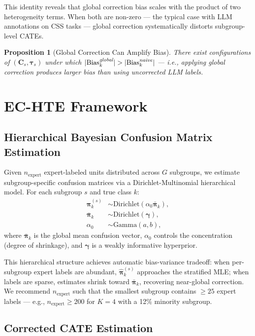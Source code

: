 \documentclass[11pt,a4paper]{article}
\newtheorem{proposition}{Proposition}
\begin{document}
This identity reveals that global correction bias scales with the product of two heterogeneity terms.
When both are non-zero --- the typical case with LLM annotations on CSS tasks --- global correction systematically distorts subgroup-level CATEs.

\begin{proposition}[Global Correction Can Amplify Bias]\label{prop:hurt}
There exist configurations of $(\mathbf{C}_s, \boldsymbol{\tau}_s)$ under which $|\text{Bias}^{\emph{global}}_k| > |\text{Bias}^{\emph{naive}}_k|$ --- i.e., applying global correction produces larger bias than using uncorrected LLM labels.
\end{proposition}

\section{EC-HTE Framework}

\subsection{Hierarchical Bayesian Confusion Matrix Estimation}

Given $n_{\text{expert}}$ expert-labeled units distributed across $G$ subgroups, we estimate subgroup-specific confusion matrices via a Dirichlet-Multinomial hierarchical model.
For each subgroup $s$ and true class $k$:
\begin{align}
\boldsymbol{\pi}_k^{(s)} &\sim \text{Dirichlet}(\alpha_0 \bar{\boldsymbol{\pi}}_k), \\
\bar{\boldsymbol{\pi}}_k &\sim \text{Dirichlet}(\boldsymbol{\gamma}), \\
\alpha_0 &\sim \text{Gamma}(a, b),
\end{align}
where $\bar{\boldsymbol{\pi}}_k$ is the global mean confusion vector, $\alpha_0$ controls the concentration (degree of shrinkage), and $\boldsymbol{\gamma}$ is a weakly informative hyperprior.

This hierarchical structure achieves automatic bias-variance tradeoff: when per-subgroup expert labels are abundant, $\hat{\boldsymbol{\pi}}_k^{(s)}$ approaches the stratified MLE; when labels are sparse, estimates shrink toward $\bar{\boldsymbol{\pi}}_k$, recovering near-global correction.
We recommend $n_{\text{expert}}$ such that the smallest subgroup contains $\geq 25$ expert labels --- e.g., $n_{\text{expert}} \geq 200$ for $K=4$ with a 12\% minority subgroup.

\subsection{Corrected CATE Estimation}
\end{document}
